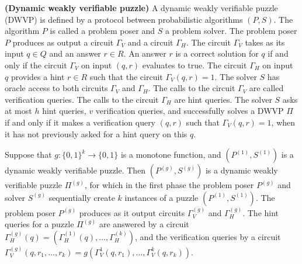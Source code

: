 \documentclass[11pt,a4paper,article,oneside]{memoir}
\begin{document}
\begin{definition} {\textbf{(Dynamic weakly verifiable puzzle)}}
  A dynamic weakly verifiable puzzle (DWVP) is defined by a protocol between probabilistic algorithms $(P,S)$.
  The algorithm $P$ is called a problem poser and $S$ a problem solver.
  The problem poser $P$ produces as output a circuit $\Gamma_{V}$ and a circuit $\Gamma_{H}$.
  The circuit $\Gamma_{V}$ takes as its input $q \in Q$ and an answer $r \in R$.
  An answer $r$ is a correct solution for $q$ if and only if the circuit $\Gamma_V$ on input $(q,r)$ evaluates to true.
  The circuit $\Gamma_H$ on input $q$ provides a hint $r \in R$ such that the circuit $\Gamma_V(q,r) = 1$.
  The solver $S$ has oracle access to both circuits $\Gamma_V$ and $\Gamma_H$.
  The calls to the circuit $\Gamma_V$ are called verification queries. The calls to the circuit $\Gamma_H$ are hint queries.
  The solver $S$ asks at most $h$ hint queries, $v$ verification queries, and successfully solves a DWVP $\Pi$ if and only if
  it makes a verification query $(q,r)$ such that $\Gamma_V(q,r) = 1$, when it has not previously asked for a hint query on this $q$.
\end{definition}
%
%
Suppose that $g: \{0,1\}^k \rightarrow \{0,1\}$ is a monotone function, and $\left( P^{(1)}, S^{(1)} \right)$ is a dynamic weakly verifiable puzzle.
Then $(P^{(g)}, S^{(g)})$ is a dynamic weakly verifiable puzzle $\Pi^{(g)}$, for which in the first phase the problem poser $P^{(g)}$ and solver $S^{(g)}$
sequentially create $k$ instances of a puzzle $\left( P^{(1)}, S^{(1)}\right)$. The problem poser $P^{(g)}$ produces as it output circuits $\Gamma_V^{(g)}$ and $\Gamma_H^{(g)}$.
The hint queries for a puzzle $\Pi^{(g)}$ are answered by a circuit $\Gamma_H^{(g)}(q) = \left( \Gamma_H^{(1)}(q), \dots, \Gamma_H^{(k)} \right)$, and the verification queries by a circuit $\Gamma_V^{(g)}(q, r_1, \dots, r_k) = g \left( \Gamma_V^{1}(q, r_1), \dots, \Gamma_V^{k}(q, r_k) \right)$.
\end{document}

